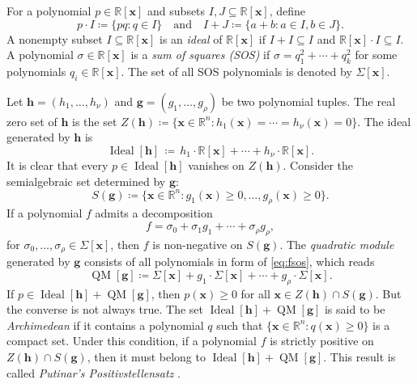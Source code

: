 \documentclass[pdflatex,sn-mathphys-num]{sn-jnl}%
\newcommand{\vect}[1]{\boldsymbol{#1}}
\theoremstyle{thmstyleone}%
\theoremstyle{thmstyletwo}%
\theoremstyle{thmstylethree}%
\begin{document}
For a polynomial $p\in\mathbb{R}[\vect{x}]$ and subsets
$I,J\subseteq\mathbb{R}[\vect{x}]$, define
\begin{equation*}
	p \cdot I \coloneqq \{pq : q \in I\} 
	\quad \text{and} \quad 
	I+J \coloneqq \{a+b : a \in I, b \in J\}.
\end{equation*}
A nonempty subset $I \subseteq \mathbb{R}[\vect{x}]$ is an \textit{ideal}
of $\mathbb{R}[\vect{x}]$ if $I+I \subseteq I$ and $\mathbb{R}[\vect{x}] \cdot I \subseteq I$.
A polynomial $\sigma \in \mathbb{R}[\vect{x}]$ is a \textit{sum of squares (SOS)} 
if $\sigma = q_1^2 + \cdots + q_k^2$ for some polynomials $q_i \in \mathbb{R}[\vect{x}]$. 
The set of all SOS polynomials is denoted by $\Sigma[\vect{x}]$.

Let $\vect{h} = (h_1, \ldots, h_{\nu})$ and
$\vect{g}=(g_1,\ldots,g_{\rho})$
be two polynomial tuples. 
The real zero set of $\vect{h}$ is the set 
$Z(\vect{h}) \coloneqq \{\vect{x} \in \mathbb{R}^n:
h_1(\vect{x}) = \cdots = h_{\nu}(\vect{x}) = 0\}$.
The ideal generated by $\vect{h}$ is
\begin{equation*}
	\operatorname{Ideal}[\vect{h}]\, \coloneqq \,
	h_1 \cdot \mathbb{R}[\vect{x}] + \cdots
	+ h_{\nu} \cdot \mathbb{R}[\vect{x}] .
\end{equation*}
It is clear that every $p\in
\operatorname{Ideal}[\vect{h}]$ vanishes on $Z(\vect{h})$.
Consider the semialgebraic set determined by $\vect{g}$:
\begin{equation*}
	S(\vect{g}) \coloneqq \{\vect{x} \in \mathbb{R}^n :
	g_1(\vect{x}) \geq 0, \ldots,
	g_{\rho}(\vect{x}) \geq 0\}.
\end{equation*}
If a polynomial $f$ admits a decomposition
\begin{equation}\label{eq:fsos}
	f = \sigma_0 + \sigma_1 g_1 + \cdots
	+ \sigma_{\rho}g_{\rho},
\end{equation}
for $\sigma_0,\ldots,\sigma_{\rho}\in\Sigma[\vect{x}]$,
then $f$ is non-negative on $S(\vect{g})$.
The \textit{quadratic module} generated by $\vect{g}$ consists of all polynomials
in form of \eqref{eq:fsos}, which reads
\begin{equation*}
	\operatorname{QM}[\vect{g}] \coloneqq
	\Sigma[\vect{x}] + g_1 \cdot \Sigma[\vect{x}]
	+ \cdots + g_{\rho} \cdot \Sigma[\vect{x}].
\end{equation*}
If $p\in \operatorname{Ideal}[\vect{h}] + \operatorname{QM}[\vect{g}]$,
then $p(\vect{x})\ge 0$ for all $\vect{x}\in Z(\vect{h}) \cap S(\vect{g})$.
But the converse is not always true.
The set $\operatorname{Ideal}[\vect{h}] + \operatorname{QM}[\vect{g}]$ 
is said to be \textit{Archimedean} if it contains a polynomial $q$ 
such that $\{\vect{x} \in \mathbb{R}^n : q(\vect{x}) \ge 0\}$ is a compact set.
Under this condition, if a polynomial $f$ is strictly 
positive on $Z(\vect{h})\cap S(\vect{g})$, 
then it must belong to $\operatorname{Ideal}[\vect{h}]+\operatorname{QM}[\vect{g}]$.
This result is called \textit{Putinar's Positivstellensatz} \cite{Putinar}.
\end{document}
